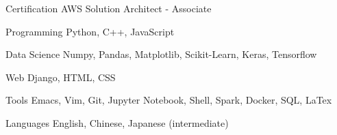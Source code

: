 


\begin{cvskills}

  
\cvskill
{Certification}
{AWS Solution Architect - Associate}


\cvskill
{Programming}
{Python, C++, JavaScript}


\cvskill
{Data Science}
{Numpy, Pandas, Matplotlib, Scikit-Learn, Keras, Tensorflow}


\cvskill
{Web}
{Django, HTML, CSS}


\cvskill
{Tools}
{Emacs, Vim, Git, Jupyter Notebook, Shell, Spark, Docker, SQL, LaTex}


\cvskill
{Languages}
{English, Chinese, Japanese (intermediate)}


\end{cvskills}